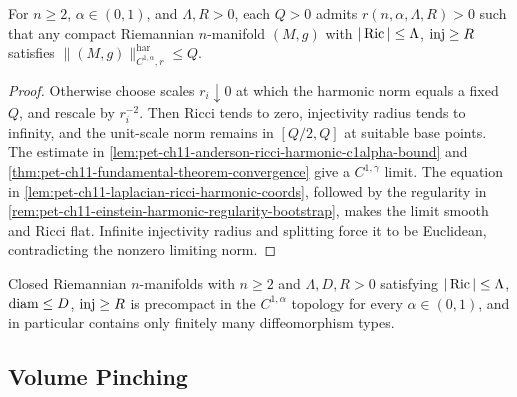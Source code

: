 \begin{theorem}
  \label{thm:pet-ch11-anderson-injectivity-radius-controls-norm}

  For $n\ge2$, $\alpha\in(0,1)$, and $\Lambda,R>0$, each $Q>0$ admits
  $r(n,\alpha,\Lambda,R)>0$ such that any compact Riemannian $n$-manifold
  $(M,g)$ with $|\operatorname{Ric}|\le\Lambda$, $\operatorname{inj}\ge R$ satisfies
  $\|(M,g)\|^{\mathrm{har}}_{C^{1,\alpha},r}\le Q$.
\end{theorem}
\begin{proof}
  \sketch
  Otherwise choose scales \(r_i\downarrow0\) at which the harmonic norm equals a fixed \(Q\), and rescale by \(r_i^{-2}\). Then Ricci tends to zero, injectivity radius tends to infinity, and the unit-scale norm remains in \([Q/2,Q]\) at suitable base points. The estimate in \cref{lem:pet-ch11-anderson-ricci-harmonic-c1alpha-bound} and \cref{thm:pet-ch11-fundamental-theorem-convergence} give a \(C^{1,\gamma}\) limit. The equation in \cref{lem:pet-ch11-laplacian-ricci-harmonic-coords}, followed by the regularity in \cref{rem:pet-ch11-einstein-harmonic-regularity-bootstrap}, makes the limit smooth and Ricci flat. Infinite injectivity radius and splitting force it to be Euclidean, contradicting the nonzero limiting norm.
\end{proof}


\begin{corollary}
  \label{cor:pet-ch11-anderson-diffeo-finiteness-injectivity}

  Closed Riemannian $n$-manifolds with $n\ge2$ and
  $\Lambda,D,R>0$ satisfying
  $|\operatorname{Ric}|\le\Lambda$, $\operatorname{diam}\le D$, $\operatorname{inj}\ge R$ is precompact in the
  $C^{1,\alpha}$ topology for every $\alpha\in(0,1)$, and in particular
  contains only finitely many diffeomorphism types.
\end{corollary}

\subsection{Volume Pinching}

